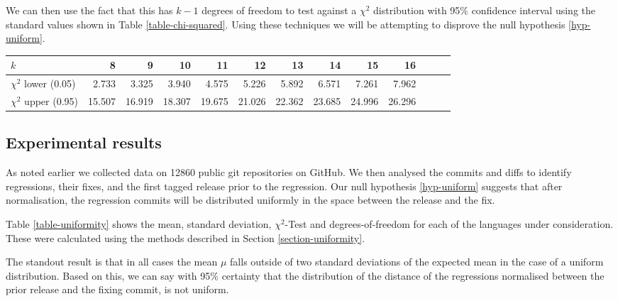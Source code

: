 \documentclass[10pt,journal,compsoc]{IEEEtran}
\begin{document}
We can then use the fact that this has $k - 1$ degrees of freedom to test against a $\chi^2$ distribution with 95\% confidence interval using the standard values shown in Table \ref{table-chi-squared}. Using these techniques we will be attempting to disprove the null hypothesis \ref{hyp-uniform}.

\begin{table*}[t!]
\begin{center}
\begin{tabular}{l r r r r r r r r r r r r} \hline
$k$ & 8 & 9 & 10 & 11 & 12 & 13 & 14 & 15 & 16 \\ \hline
$\chi^2$ lower (0.05) & 2.733 & 3.325 & 3.940 & 4.575 & 5.226 & 5.892 & 6.571 & 7.261 & 7.962 \\
$\chi^2$ upper (0.95) & 15.507 & 16.919 & 18.307 & 19.675 & 21.026 & 22.362 & 23.685 & 24.996 & 26.296 \\ \hline
\end{tabular}
\caption{\label{table-chi-squared}$\chi^2$ distribution values for 95\% confidence.}
\end{center}
\end{table*}

\subsection{Experimental results}

As noted earlier we collected data on 12860 public git repositories on GitHub. We then analysed the commits and diffs to identify regressions, their fixes, and the first tagged release prior to the regression. Our null hypothesis \ref{hyp-uniform} suggests that after normalisation, the regression commits will be distributed uniformly in the space between the release and the fix.

Table \ref{table-uniformity} shows the mean, standard deviation, $\chi^2$-Test and degrees-of-freedom for each of the languages under consideration. These were calculated using the methods described in Section \ref{section-uniformity}.

The standout result is that in all cases the mean $\mu$ falls outside of two standard deviations of the expected mean in the case of a uniform distribution. Based on this, we can say with 95\% certainty that the distribution of the distance of the regressions normalised between the prior release and the fixing commit, is not uniform.
\end{document}
